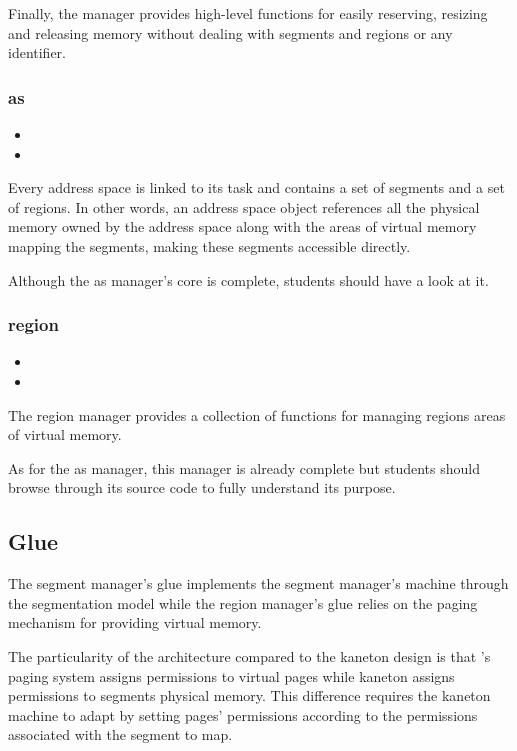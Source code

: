 Finally, the  manager provides high-level functions for easily
reserving, resizing and releasing memory without dealing with segments and
regions or any identifier.

\subsubsection*{as}

\begin{itemize}
  \item
  \item
\end{itemize}

Every address space is linked to its task and contains a set of segments
and a set of regions. In other words, an address space object references all
the physical memory owned by the address space along with the areas of
virtual memory mapping the segments, making these segments accessible directly.

Although the as manager's core is complete, students should have a look at
it.

\subsubsection*{region}

\begin{itemize}
  \item
  \item
\end{itemize}

The region manager provides a collection of functions for managing regions
\ie{} areas of virtual memory.

As for the as manager, this manager is already complete but students
should browse through its source code to fully understand its purpose.

\subsection{Glue}

The segment manager's glue implements the segment manager's machine through
the  segmentation model while the region manager's glue relies on
the paging mechanism for providing virtual memory.

The particularity of the  architecture compared to the kaneton
design is that 's paging system assigns permissions to virtual
pages while kaneton assigns permissions to segments \ie{} physical memory.
This difference requires the kaneton machine to adapt by setting pages'
permissions according to the permissions associated with the segment to map.

